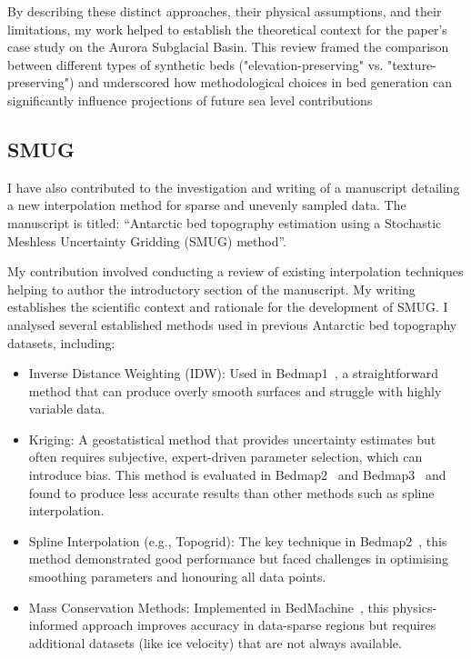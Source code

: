 By describing these distinct approaches, their physical assumptions, and their limitations, my work helped to establish the theoretical context for the paper's case study on the Aurora Subglacial Basin. This review framed the comparison between different types of synthetic beds ("elevation-preserving" vs. "texture-preserving") and underscored how methodological choices in bed generation can significantly influence projections of future sea level contributions

\newpage
\subsection{SMUG}
I have also contributed to the investigation and writing of a manuscript detailing a new interpolation method for sparse and unevenly sampled data. The manuscript is titled: ``Antarctic bed topography estimation using a Stochastic Meshless Uncertainty Gridding (SMUG) method''. 

My contribution involved conducting a review of existing interpolation techniques helping to author the introductory section of the manuscript. My writing establishes the scientific context and rationale for the development of SMUG. I analysed several established methods used in previous Antarctic bed topography datasets, including:

\begin{itemize}
    \item{Inverse Distance Weighting (IDW)}: Used in Bedmap1~\cite{Lythe_2001}, a straightforward method that can produce overly smooth surfaces and struggle with highly variable data.

    \item{Kriging}: A geostatistical method that provides uncertainty estimates but often requires subjective, expert-driven parameter selection, which can introduce bias. This method is evaluated in Bedmap2~\cite{Fretwell_2013} and Bedmap3~\cite{Pritchard_2025} and found to produce less accurate results than other methods such as spline interpolation.

    \item{Spline Interpolation (e.g., Topogrid)}: The key technique in Bedmap2~\cite{Fretwell_2013}, this method demonstrated good performance but faced challenges in optimising smoothing parameters and honouring all data points.

    \item{Mass Conservation Methods}: Implemented in BedMachine~\cite{Morlighem_2020}, this physics-informed approach improves accuracy in data-sparse regions but requires additional datasets (like ice velocity) that are not always available.
\end{itemize}

